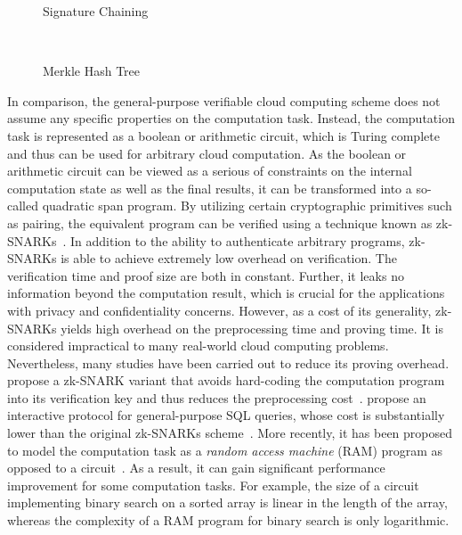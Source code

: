 \begin{figure}[t]
    \centering
    \begin{minipage}[b]{0.5\linewidth}
        \centering
        \resizebox{.7\linewidth}{!}{}
        \caption{Signature Chaining}\label{fig:related-works:chain}
    \end{minipage}~%
    \begin{minipage}[b]{0.5\linewidth}
        \centering
        \resizebox{\linewidth}{!}{}
        \caption{Merkle Hash Tree}\label{fig:related-works:mht}
    \end{minipage}
\end{figure}

In comparison, the general-purpose verifiable cloud computing scheme does not assume any specific properties on the computation task. Instead, the computation task is represented as a boolean or arithmetic circuit, which is Turing complete and thus can be used for arbitrary cloud computation. As the boolean or arithmetic circuit can be viewed as a serious of constraints on the internal computation state as well as the final results, it can be transformed into a so-called quadratic span program. By utilizing certain cryptographic primitives such as pairing, the equivalent program can be verified using a technique known as zk-SNARKs~\cite{10.1109/sp.2013.47}. In addition to the ability to authenticate arbitrary programs, zk-SNARKs is able to achieve extremely low overhead on verification. The verification time and proof size are both in constant. Further, it leaks no information beyond the computation result, which is crucial for the applications with privacy and confidentiality concerns. However, as a cost of its generality, zk-SNARKs yields high overhead on the preprocessing time and proving time. It is considered impractical to many real-world cloud computing problems. Nevertheless, many studies have been carried out to reduce its proving overhead. \citeauthor{Ben-Sasson:2014:SNZ:2671225.2671275} propose a zk-SNARK variant that avoids hard-coding the computation program into its verification key and thus reduces the preprocessing cost~\cite{Ben-Sasson:2014:SNZ:2671225.2671275}. \citeauthor{10.1109/sp.2017.43} propose an interactive protocol for general-purpose SQL queries, whose cost is substantially lower than the original zk-SNARKs scheme~\cite{10.1109/sp.2017.43}. More recently, it has been proposed to model the computation task as a \emph{random access machine} (RAM) program as opposed to a circuit~\cite{10.1145/2517349.2522733,10.1007/978-3-642-40084-1_6,10.1109/sp.2018.00013}. As a result, it can gain significant performance improvement for some computation tasks. For example, the size of a circuit implementing binary search on a sorted array is linear in the length of the array, whereas the complexity of a RAM program for binary search is only logarithmic.

